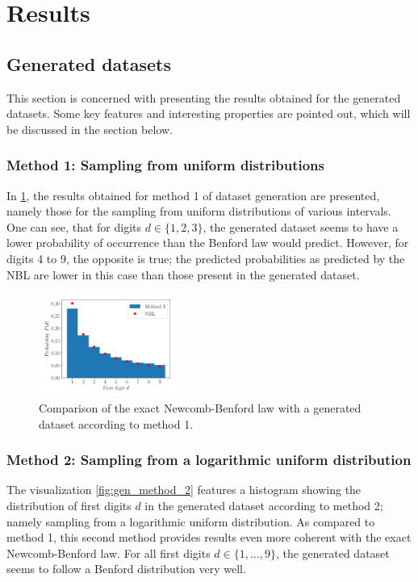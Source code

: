 \documentclass[a4paper,11pt, twocolumn]{article}
\begin{document}
\section{Results}
\subsection{Generated datasets}
This section is concerned with presenting the results obtained for the generated datasets. Some key features and interesting properties are pointed out, which will be discussed in the section below.

\subsubsection{Method 1: Sampling from uniform distributions}
In \cref{fig:gen_method_1}, the results obtained for method 1 of dataset generation are presented, namely those for the sampling from uniform distributions of various intervals. One can see, that for digits $d \in \{1,2,3\}$, the generated dataset seems to have a lower probability of occurrence than the Benford law would predict. However, for digits 4 to 9, the opposite is true; the predicted probabilities as predicted by the NBL are lower in this case than those present in the generated dataset.
\begin{figure}[h]
	\centering
	\includegraphics[width=0.4\textwidth]{figures/gen_method_1.pdf}
	\caption{Comparison of the exact Newcomb-Benford law with a generated dataset according to method 1.}
	\label{fig:gen_method_1}
\end{figure}


\subsubsection{Method 2: Sampling from a logarithmic uniform distribution}
The visualization \cref{fig:gen_method_2} features a histogram showing the distribution of first digits $d$ in the generated dataset according to method 2; namely sampling from a logarithmic uniform distribution. As compared to method 1, this second method provides results even more coherent with the exact Newcomb-Benford law. For all first digits $d \in \{1,\dots,9\}$, the generated dataset seems to follow a Benford distribution very well.
\end{document}
